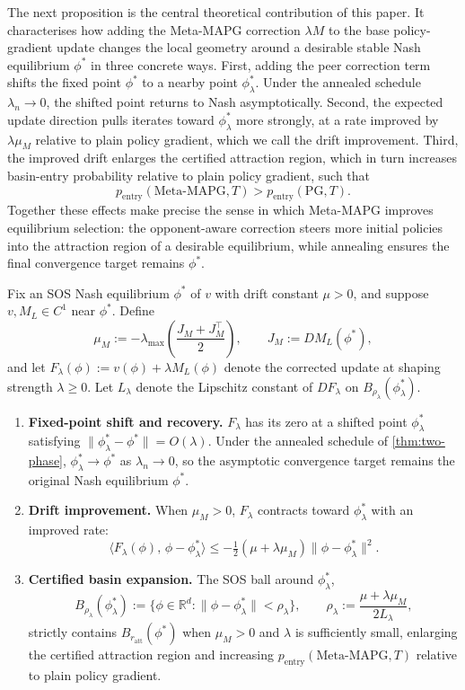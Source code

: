 \documentclass{nextgame2026} %
\begin{document}
The next proposition is the central theoretical contribution of this paper. It characterises how adding the Meta-MAPG correction $\lambda M$ to the base policy-gradient update changes the local geometry around a desirable stable Nash equilibrium $\phi^*$ in three concrete ways. 
First, adding the peer correction term shifts the fixed point $\phi^*$ to a nearby point $\phi^*_\lambda$. Under the annealed schedule $\lambda_n \to 0$, the shifted point returns to Nash asymptotically. Second, the expected update direction pulls iterates toward 
$\phi^*_\lambda$ more strongly, at a rate improved by $\lambda\mu_M$ relative to plain policy gradient, which we call the drift improvement. Third, the improved drift enlarges the certified attraction region, which in turn increases basin-entry probability relative to plain policy gradient, such that
\[
p_{\mathrm{entry}}(\mathrm{Meta\text{-}MAPG}, T) > 
p_{\mathrm{entry}}(\mathrm{PG}, T).
\]
Together these effects make precise the sense in which Meta-MAPG improves equilibrium selection: the opponent-aware correction steers more initial policies into the attraction region of a desirable equilibrium, while 
annealing ensures the final convergence target remains $\phi^*$.

\begin{proposition}
\label{prop:basin}
Fix an SOS Nash equilibrium $\phi^*$ of $v$ with drift constant $\mu > 0$, 
and suppose $v, M_L \in C^1$ near $\phi^*$. Define
\[
\mu_M := -\lambda_{\max}\!\left(\frac{J_M + J_M^\top}{2}\right),
\qquad J_M := DM_L(\phi^*),
\]
and let $F_\lambda(\phi) := v(\phi) + \lambda M_L(\phi)$ denote the 
corrected update at shaping strength $\lambda \geq 0$. Let $L_\lambda$ denote 
the Lipschitz constant of $DF_\lambda$ on $B_{\rho_\lambda}(\phi^*_\lambda)$.
\begin{enumerate}[label=(\roman*)]
\item \textbf{Fixed-point shift and recovery.} $F_\lambda$ has its zero 
at a shifted point $\phi^*_\lambda$ satisfying 
$\|\phi^*_\lambda - \phi^*\| = O(\lambda)$. Under the annealed schedule of 
\cref{thm:two-phase}, $\phi^*_\lambda \to \phi^*$ as $\lambda_n \to 0$, 
so the asymptotic convergence target 
remains the original Nash equilibrium $\phi^*$.
\item \textbf{Drift improvement.} When $\mu_M > 0$, $F_\lambda$ 
contracts toward $\phi^*_\lambda$ with an improved rate:
\[
\langle F_\lambda(\phi),\, \phi - \phi^*_\lambda \rangle 
\leq -\tfrac{1}{2}(\mu + \lambda\mu_M)\|\phi - \phi^*_\lambda\|^2.
\]
\item \textbf{Certified basin expansion.} The SOS ball 
around $\phi^*_\lambda$,
\[
B_{\rho_\lambda}(\phi^*_\lambda) := \bigl\{\phi \in \mathbb{R}^d : 
\|\phi - \phi^*_\lambda\| < \rho_\lambda\bigr\}, 
\qquad \rho_\lambda := \frac{\mu + \lambda\mu_M}{2L_\lambda},
\]
strictly contains $B_{r_{\mathrm{att}}}(\phi^*)$ when $\mu_M > 0$ and 
$\lambda$ is sufficiently small, enlarging the certified attraction 
region and increasing $p_{\mathrm{entry}}(\mathrm{Meta\text{-}MAPG}, T)$ 
relative to plain policy gradient.
\end{enumerate}
\end{proposition}
\end{document}
